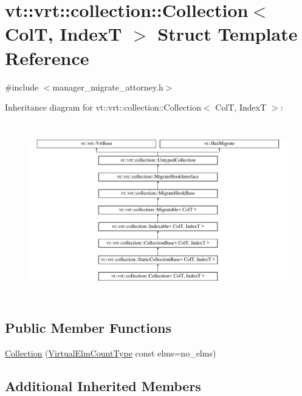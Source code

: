 \hypertarget{structvt_1_1vrt_1_1collection_1_1_collection}{}\section{vt\+:\+:vrt\+:\+:collection\+:\+:Collection$<$ ColT, IndexT $>$ Struct Template Reference}
\label{structvt_1_1vrt_1_1collection_1_1_collection}


{\ttfamily \#include $<$manager\+\_\+migrate\+\_\+attorney.\+h$>$}

Inheritance diagram for vt\+:\+:vrt\+:\+:collection\+:\+:Collection$<$ ColT, IndexT $>$\+:\begin{figure}[H]
\begin{center}
\leavevmode
\includegraphics[height=7.682927cm]{structvt_1_1vrt_1_1collection_1_1_collection}
\end{center}
\end{figure}
\subsection*{Public Member Functions}
\begin{DoxyCompactItemize}
\item 
\hyperlink{structvt_1_1vrt_1_1collection_1_1_collection_a1781c529f6184d1befe7e7d0781f6f50}{Collection} (\hyperlink{namespacevt_ac115668758184050beff7a9281a2c490}{Virtual\+Elm\+Count\+Type} const elms=no\+\_\+elms)
\end{DoxyCompactItemize}
\subsection*{Additional Inherited Members}


